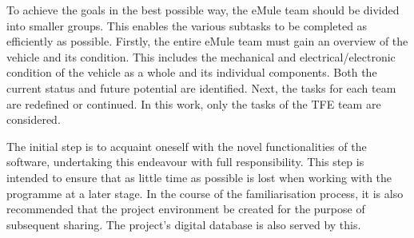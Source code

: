To achieve the goals in the best possible way, the eMule team should be divided into smaller groups. This enables the various subtasks to be completed as efficiently as possible. Firstly, the entire eMule team must gain an overview of the vehicle and its condition. This includes the mechanical and electrical/electronic condition of the vehicle as a whole and its individual components. Both the current status and future potential are identified. Next, the tasks for each team are redefined or continued. In this work, only the tasks of the \glqq TFE team\grqq{} are considered. \newline

The initial step is to acquaint oneself with the novel functionalities of the software, undertaking this endeavour with full responsibility. This step is intended to ensure that as little time as possible is lost when working with the programme at a later stage. In the course of the familiarisation process, it is also recommended that the project environment be created for the purpose of subsequent sharing. The project's digital database is also served by this.

